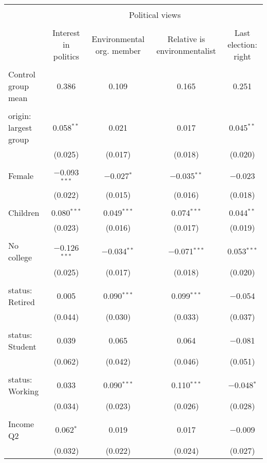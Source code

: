 
\begin{tabular}{@{\extracolsep{5pt}}lcccc} 
\\[-1.8ex]\hline 
\hline \\[-1.8ex] 
 & \multicolumn{4}{c}{Political views} \\ 
\cline{2-5} 
\\[-1.8ex] & Interest in politics & Environmental org. member & Relative is environmentalist & Last election: right \\ 
\hline \\[-1.8ex] 
 Control group mean & 0.386 & 0.109 & 0.165 & 0.251  \\ \hline \\[-1.8ex] origin: largest group & 0.058$^{**}$ & 0.021 & 0.017 & 0.045$^{**}$ \\ 
  & (0.025) & (0.017) & (0.018) & (0.020) \\ 
  & & & & \\ 
 Female & $-$0.093$^{***}$ & $-$0.027$^{*}$ & $-$0.035$^{**}$ & $-$0.023 \\ 
  & (0.022) & (0.015) & (0.016) & (0.018) \\ 
  & & & & \\ 
 Children & 0.080$^{***}$ & 0.049$^{***}$ & 0.074$^{***}$ & 0.044$^{**}$ \\ 
  & (0.023) & (0.016) & (0.017) & (0.019) \\ 
  & & & & \\ 
 No college & $-$0.126$^{***}$ & $-$0.034$^{**}$ & $-$0.071$^{***}$ & 0.053$^{***}$ \\ 
  & (0.025) & (0.017) & (0.018) & (0.020) \\ 
  & & & & \\ 
 status: Retired & 0.005 & 0.090$^{***}$ & 0.099$^{***}$ & $-$0.054 \\ 
  & (0.044) & (0.030) & (0.033) & (0.037) \\ 
  & & & & \\ 
 status: Student & 0.039 & 0.065 & 0.064 & $-$0.081 \\ 
  & (0.062) & (0.042) & (0.046) & (0.051) \\ 
  & & & & \\ 
 status: Working & 0.033 & 0.090$^{***}$ & 0.110$^{***}$ & $-$0.048$^{*}$ \\ 
  & (0.034) & (0.023) & (0.026) & (0.028) \\ 
  & & & & \\ 
 Income Q2 & 0.062$^{*}$ & 0.019 & 0.017 & $-$0.009 \\ 
  & (0.032) & (0.022) & (0.024) & (0.027) \\ 

\end{tabular}
